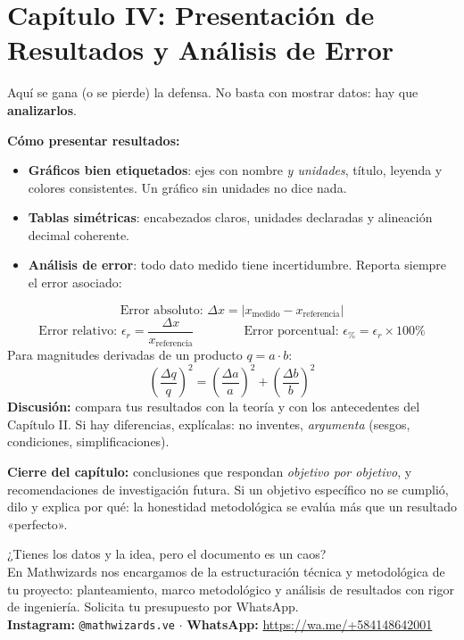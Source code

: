 \documentclass[12pt, letterpaper]{article}
\makeatletter
\newcommand{\mwcta}[2]{%
  \begin{center}
    \begin{minipage}{0.94\linewidth}
      \begin{cuadroextra}
        \centering
        {\nxheav\Large\color{mwprimario}#1}\\[8pt]
        {\small #2}\\[12pt]
        {\footnotesize\color{mwgris}
          \textbf{Instagram:} \texttt{@mathwizards.ve} \quad$\cdot$\quad
          \textbf{WhatsApp:} \url{https://wa.me/+584148642001}}
      \end{cuadroextra}
    \end{minipage}
  \end{center}
}
\makeatother
\begin{document}
\newpage

\section{Capítulo IV: Presentación de Resultados y Análisis de Error}

\noindent Aquí se gana (o se pierde) la defensa. No basta con mostrar datos: hay que \textbf{analizarlos}.

\begin{cuadroteoria}
  \textbf{Cómo presentar resultados:}
  \begin{itemize}
    \item \textbf{Gráficos bien etiquetados}: ejes con nombre \emph{y unidades}, título, leyenda y colores consistentes. Un gráfico sin unidades no dice nada.
    \item \textbf{Tablas simétricas}: encabezados claros, unidades declaradas y alineación decimal coherente.
    \item \textbf{Análisis de error}: todo dato medido tiene incertidumbre. Reporta siempre el error asociado:
  \end{itemize}
  \[
    \text{Error absoluto: } \Delta x = |x_{\text{medido}} - x_{\text{referencia}}|
  \]
  \[
    \text{Error relativo: } \epsilon_r = \frac{\Delta x}{x_{\text{referencia}}}
    \qquad\qquad
    \text{Error porcentual: } \epsilon_{\%} = \epsilon_r \times 100\%
  \]
  Para magnitudes derivadas de un producto $q = a \cdot b$:
  \[
    \left(\frac{\Delta q}{q}\right)^2 = \left(\frac{\Delta a}{a}\right)^2 + \left(\frac{\Delta b}{b}\right)^2
  \]
  \textbf{Discusión:} compara tus resultados con la teoría y con los antecedentes del Capítulo II. Si hay diferencias, explícalas: no inventes, \emph{argumenta} (sesgos, condiciones, simplificaciones).
\end{cuadroteoria}

\noindent\textbf{Cierre del capítulo:} conclusiones que respondan \emph{objetivo por objetivo}, y recomendaciones de investigación futura. Si un objetivo específico no se cumplió, dilo y explica por qué: la honestidad metodológica se evalúa más que un resultado «perfecto».

\newpage
\vspace*{\fill}

\mwcta{¿Tienes los datos y la idea, pero el documento es un caos?}{En Mathwizards nos encargamos de la estructuración técnica y metodológica de tu proyecto: planteamiento, marco metodológico y análisis de resultados con rigor de ingeniería. Solicita tu presupuesto por WhatsApp.}

\vspace*{\fill}
\end{document}
